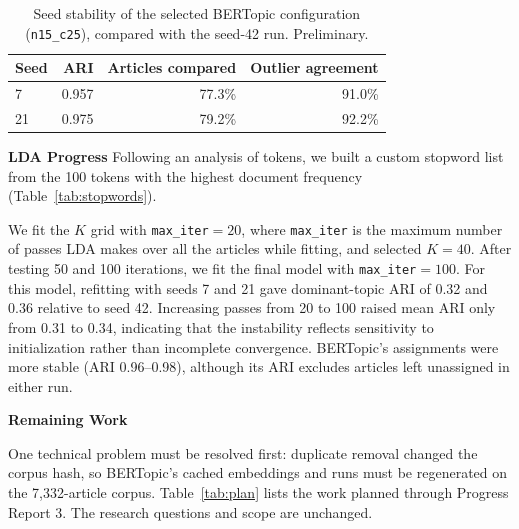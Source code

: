 \documentclass[conference]{IEEEtran}
\begin{document}
\begin{table}[H]
\caption{Seed stability of the selected BERTopic configuration (\texttt{n15\_c25}), compared with the seed-42 run. Preliminary.}
\label{tab:stability}
\centering
\footnotesize
\begin{tabular}{lrrr}
\toprule
\textbf{Seed} & \textbf{ARI} & \textbf{Articles compared} & \textbf{Outlier agreement} \\
\midrule
7  & 0.957 & 77.3\% & 91.0\% \\
21 & 0.975 & 79.2\% & 92.2\% \\
\bottomrule
\end{tabular}
\end{table}

\textbf{LDA Progress}
Following an analysis of tokens, we built a custom stopword list from the 100 tokens with the highest document frequency (Table~\ref{tab:stopwords}).

We fit the $K$ grid with \texttt{max\_iter}$=20$, where \texttt{max\_iter} is the maximum number of passes LDA makes over all the articles while fitting, and selected $K=40$. After testing 50 and 100 iterations, we fit the final model with \texttt{max\_iter}$=100$. For this model, refitting with seeds 7 and 21 gave dominant-topic ARI of 0.32 and 0.36 relative to seed 42. Increasing passes from 20 to 100 raised mean ARI only from 0.31 to 0.34, indicating that the instability reflects sensitivity to initialization rather than incomplete convergence. BERTopic's assignments were more stable (ARI 0.96--0.98), although its ARI excludes articles left unassigned in either run.



\begin{center}\large\textbf{Remaining Work}\end{center}

One technical problem must be resolved first: duplicate removal changed the corpus hash, so BERTopic's cached embeddings and runs must be regenerated on the 7,332-article corpus. Table~\ref{tab:plan} lists the work planned through Progress Report 3. The research questions and scope are unchanged.
\end{document}
